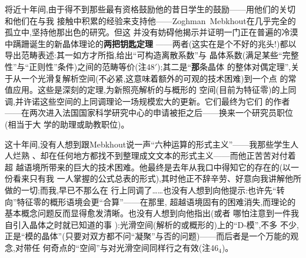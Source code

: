 将近十年间,由于得不到那些最有资格鼓励他的昔日学生的鼓励——用他们的关切和他们在与我
接触中积累的经验来支持他——Zoghman~Mebkhout在几乎完全的孤立中,坚持他那出色的研究。但这
并没有妨碍他揭示并证明一门正在普遍的冷漠中蹒跚诞生的新晶体理论的\textbf{两把钥匙定理}
——两者(这实在是个不好的兆头!)都以导出范畴表述:其一如方才所指,给出“可构造离散系数”与
晶体系数(满足某些“完整性”与“正则性”条件)之间的范畴等价(注48$'$);其二是“\textbf{那}条晶体
的整体对偶定理”,关于从一个光滑复解析空间(不必紧,这意味着额外的可观的技术困难)到一个点
的常值应用。这些是深刻的定理,为新照亮解析的与概形的
空间(目前为特征零)的上同调,并许诺这些空间的上同调理论一场规模宏大的更新。它们最终为它们
的作者——在两次进入法国国家科学研究中心的申请被拒之后——换来一个研究员职位(相当于大
学的助理或助教职位)。

这十年间,没有人想到跟Mebkhout说一声“六种运算的形式主义”——我那些学生人人烂熟
、却在任何地方都找不到整理成文文本的形式主义——而他正苦苦对付着超
越语境所带来的巨大的技术困难。他最终是去年从我口中得知它的存在的(以一份看来只有我
一人掌握的公式总表的形式),其时他正不辞辛劳、好意向我讲解他所做的一切;而我,早已不那么在
行上同调了……也没有人想到向他提示:也许先“转向”特征零的概形语境会更“合算”——在那里,
超越语境固有的困难消失,而理论的基本概念问题反而显得愈发清晰。也没有人想到向他指出(或者
哪怕注意到一件我自引入晶体之时就已知道的事
):光滑空间(解析的或概形的)上的“D-模”,不多
不少,正是“模的晶体”(只要对双方都不问“凝聚”与否的问题)——而后者是一个万能的观念,对带任
何奇点的“空间”与对光滑空间同样行之有效(注46$_{4}$)。

